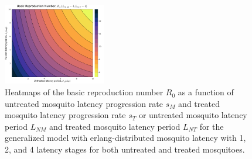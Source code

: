 \documentclass[11pt]{article}
\begin{document}
\begin{figure}[H]
  \includegraphics[width=0.4\textwidth]{../../fig/R0_periods_SMxST_4x4_uncal.pdf}
  \caption{Heatmaps of the basic reproduction number $R_0$ as a function of untreated mosquito latency progression rate $s_M$ and treated mosquito latency progression rate $s_T$ or untreated mosquito latency period $L_{NM}$ and treated mosquito latency period $L_{NT}$ for the generalized model with erlang-distributed mosquito latency with 1, 2, and 4 latency stages for both untreated and treated mosquitoes.}
\end{figure}
\end{document}
